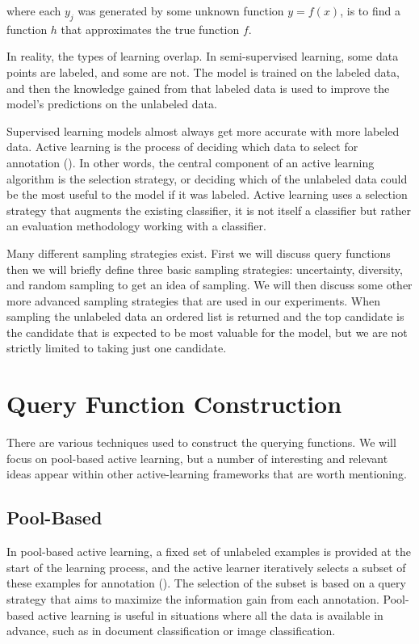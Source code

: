 where each $y_j$ was generated by some unknown function $y=f(x)$, is to find a function $h$ that approximates the true function $f$.

In reality, the types of learning overlap. In semi-supervised learning, some data points are labeled, and some are not. The model is trained on the labeled data, and then the knowledge gained from that labeled data is used to improve the model's predictions on the unlabeled data. 

Supervised learning models almost always get more accurate with more labeled data. Active learning is the process of deciding which data to select for annotation (\cite{munro2021human}). In other words, the central component of an active learning algorithm is the selection strategy, or deciding which of the unlabeled data could be the most useful to the model if it was labeled. Active learning uses a selection strategy that augments the existing classifier, it is not itself a classifier but rather an evaluation methodology working with a classifier.

Many different sampling strategies exist. First we will discuss query functions then we will briefly define three basic sampling strategies: uncertainty, diversity, and random sampling to get an idea of sampling. We will then discuss some other more advanced sampling strategies that are used in our experiments. When sampling the unlabeled data an ordered list is returned and the top candidate is the candidate that is expected to be most valuable for the model, but we are not strictly limited to taking just one candidate.

\section{Query Function Construction}

There are various techniques used to construct the querying functions. We will focus on pool-based active learning, but a number of interesting and relevant ideas appear within other active-learning frameworks that are worth mentioning.

\subsection{Pool-Based}
In pool-based active learning, a fixed set of unlabeled examples is provided at the start of the learning process, and the active learner iteratively selects a subset of these examples for annotation (\cite{huang2016alce}). The selection of the subset is based on a query strategy that aims to maximize the information gain from each annotation. Pool-based active learning is useful in situations where all the data is available in advance, such as in document classification or image classification.

